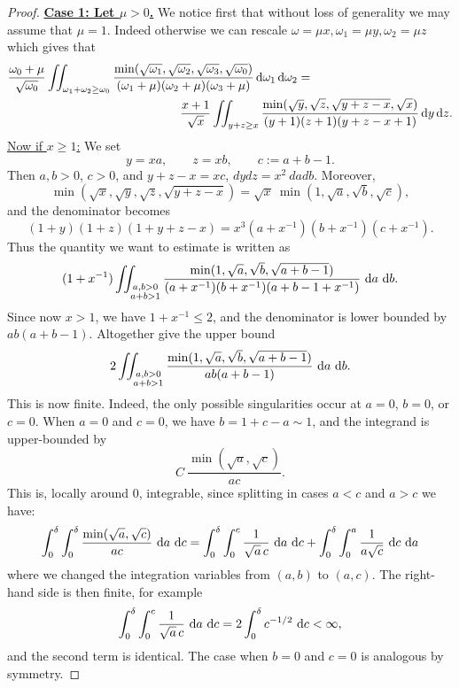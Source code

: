 \documentclass[reqno,11pt,letterpaper]{amsart}
\numberwithin{equation}{section}
\newcommand{\dd}{\, {\rm d}}
\begin{document}
\begin{proof}
    \noindent
    \underline{\textbf{Case 1: Let $\mu>0$.}} We notice first that without loss of generality we may assume that $\mu=1$. Indeed otherwise we can rescale $\omega = \mu x, \omega_1 = \mu y, \omega_2= \mu z $ which gives that 
    \begin{align*}
        &\frac{\omega_0 +\mu}{\sqrt{\omega_0}} 
 \iint_{\omega_1+\omega_2 \geq \omega_0} \frac{\min (\sqrt{\omega_1}, \sqrt{\omega_2}, \sqrt{\omega_3}, \sqrt{\omega_0})}{(\omega_1+\mu)(\omega_2+\mu)(\omega_3+\mu)} \dd  \omega_1 \dd \omega_2  =\\
 & \hspace{5cm}
 \frac{x+1}{\sqrt{x}} 
 \iint_{y+z \geq x} \frac{\min (\sqrt{y}, \sqrt{z}, \sqrt{y+z-x}, \sqrt{x})}{(y+1)(z+1)(y+z-x+1)} \dd y \dd z. 
    \end{align*}  
    \underline{Now if $x\geq 1$:}  We set $$
y=xa,\qquad z=xb,\qquad c:=a+b-1.$$
Then $a,b>0$, $c>0$,  and
$ y+z-x=xc$, $dydz=x^2\ da db.$ Moreover,
$$
\min(\sqrt{x},\sqrt y,\sqrt z,\sqrt{y+z-x})
=
\sqrt{x}\ \min(1,\sqrt a,\sqrt b,\sqrt c),
$$
and the denominator becomes  
$$(1+y)(1+z)(1+y+z-x)
=
x^3(a+x^{-1})(b+x^{-1})(c+x^{-1}).$$
Thus the quantity we want to estimate is written as 
$$(1+x^{-1})
\iint_{\substack{a,b>0\\ a+b>1}}
\frac{
\min(1,\sqrt a,\sqrt b,\sqrt{a+b-1})
}
{(a+x^{-1})(b+x^{-1})(a+b-1+x^{-1})}
\,\dd a\,\dd b.
$$
Since now $x> 1$, we have $1+x^{-1}\le 2$, and the denominator is  lower bounded by  
$ab(a+b-1).$ Altogether give the upper bound 
$$
2
\iint_{\substack{a,b>0\\ a+b>1}}
\frac{
\min(1,\sqrt a,\sqrt b,\sqrt{a+b-1})
}
{ab(a+b-1)}
\,\dd a\,\dd b.
$$
This is now finite. Indeed, 
the only possible singularities occur at $a=0$, $b=0$, or $c=0$. When  $a=0$ and  $c=0$, we have  $b=1+c-a\sim 1$, and the integrand is upper-bounded by
$$
C\ \frac{\min(\sqrt a,\sqrt c)}{ac}.
$$
This is, locally around $0$, integrable, since splitting in cases  $a<c$ and $a>c$ we have: 
$$
\int_0^\delta\int_0^\delta
\frac{\min(\sqrt a,\sqrt c)}{ac}\,\dd a\,\dd c
=
\int_0^\delta\int_0^c
\frac{1}{\sqrt a\,c}\,\dd a\,\dd c
+
\int_0^\delta\int_0^a
\frac{1}{a\sqrt c}\,\dd c\,\dd a
$$
where we changed the integration variables from $(a,b)$ to $(a,c)$.
The right-hand side is then finite, for example
$$
\int_0^\delta\int_0^c
\frac{1}{\sqrt a\,c}\,\dd a\,\dd c
=
2\int_0^\delta c^{-1/2}\,\dd c <\infty,
$$
and the second term is identical. The case when $b=0$ and $c=0$ is analogous by symmetry.


\end{proof}
\end{document}
